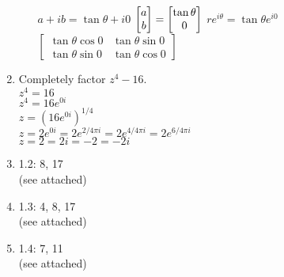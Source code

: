 \documentclass[11pt]{article}
\numberwithin{equation}{section}
\begin{document}
\begin{enumerate}
\begin{enumerate}
$a+ib = \tan\theta + i0$
$\left[\begin{array}{@{}c@{}} a\\ b\end{array}\right] = \left[\begin{array}{@{}c@{}} \tan\theta\\0\end{array}\right]$
$re^{i\theta} = \tan\theta e^{i0}$
$\left[\begin{array}{cc} \tan\theta\cos0&  \tan\theta\sin0 \\  \tan\theta\sin0 & \tan\theta\cos0 \end{array}\right]$
\end{enumerate}
\item Completely factor $z^4-16$.\\[.5cm]
$z^4 = 16$\\
$z^4 = 16 e^{0i}$\\
$z = (16 e^{0i})^{1/4}$\\
$z = 2 e^{0i} = 2 e^{2/4\pi i} = 2 e^{4/4\pi i} =2 e^{6/4\pi i}$\\
$z = 2  = 2 i = -2 = -2i$\\
\item 1.2:  8, 17\\
(see attached)
\item 1.3: 4, 8, 17\\
(see attached)
\item  1.4: 7, 11\\
(see attached)
\end{enumerate}
\end{document}
